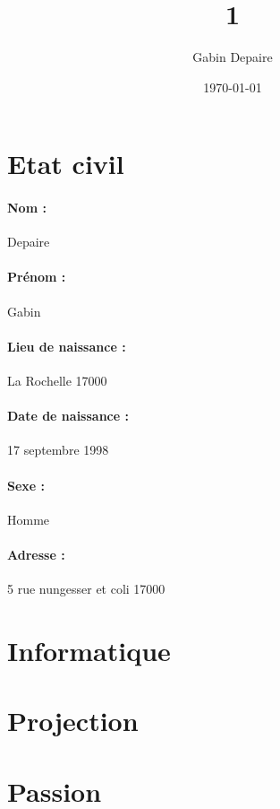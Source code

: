 \documentclass{article}
\title{1}
\author{Gabin Depaire}
\date\today
\begin{document}
\maketitle

\section{Etat civil}

\paragraph{Nom : }
Depaire
\paragraph{Prénom : }
Gabin
\paragraph{Lieu de naissance : }
La Rochelle 17000
\paragraph{Date de naissance : }
17 septembre 1998
\paragraph{Sexe : }
Homme
\paragraph{Adresse : }
5 rue nungesser et coli 17000


\section{Informatique}

\paragraph{}



\section{Projection}

\paragraph{}



\section{Passion}

\paragraph{}
\end{document}
